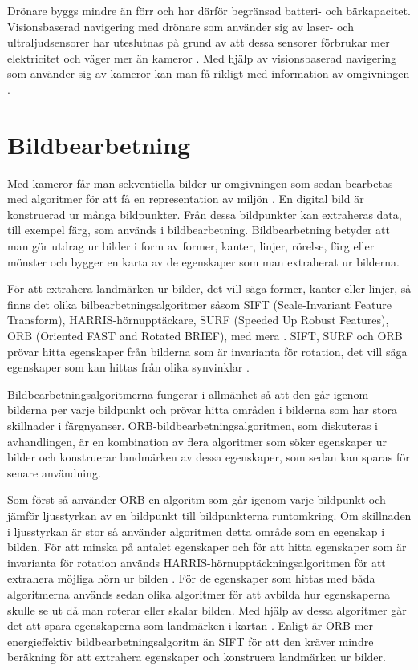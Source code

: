 Drönare byggs mindre än förr och har därför begränsad batteri- och bärkapacitet. Visionsbaserad navigering med drönare som använder sig av laser- och ultraljudsensorer har uteslutnas på grund av att dessa sensorer förbrukar mer elektricitet och väger mer än kameror \citep{6385934}. Med hjälp av visionsbaserad navigering som använder sig av kameror kan man få rikligt med information av omgivningen \citep{geospatial}.

\section{Bildbearbetning}

Med kameror får man sekventiella bilder ur omgivningen som sedan bearbetas med algoritmer för att få en representation av miljön \citep{982903}. En digital bild är konstruerad ur många bildpunkter. Från dessa bildpunkter kan extraheras data, till exempel färg, som används i bildbearbetning. Bildbearbetning betyder att man gör utdrag ur bilder i form av former, kanter, linjer, rörelse, färg eller mönster och bygger en karta av de egenskaper som man extraherat ur bilderna. 

För att extrahera landmärken ur bilder, det vill säga former, kanter eller linjer, så finns det olika bilbearbetningsalgoritmer såsom SIFT (Scale-Invariant Feature Transform), HARRIS-hörnupptäckare, SURF (Speeded Up Robust Features), ORB (Oriented FAST and Rotated BRIEF), med mera \citep{orb, slamproblem, mapbuildingsift}. SIFT, SURF och ORB prövar hitta egenskaper från bilderna som är invarianta för rotation, det vill säga egenskaper som kan hittas från olika synvinklar \citep{orb}. 

Bildbearbetningsalgoritmerna fungerar i allmänhet så att den går igenom bilderna per varje bildpunkt och prövar hitta områden i bilderna som har stora skillnader i färgnyanser. ORB-bildbearbetningsalgoritmen, som diskuteras i avhandlingen, är en kombination av flera algoritmer som söker egenskaper ur bilder och konstruerar landmärken av dessa egenskaper, som sedan kan sparas för senare användning. 

Som först så använder ORB en algoritm som går igenom varje bildpunkt och jämför ljusstyrkan av en bildpunkt till bildpunkterna runtomkring. Om skillnaden i ljusstyrkan är stor så använder algoritmen detta område som en egenskap i bilden. För att minska på antalet egenskaper och för att hitta egenskaper som är invarianta för rotation används HARRIS-hörnupptäckningsalgoritmen för att extrahera möjliga hörn ur bilden \citep{orb}. För de egenskaper som hittas med båda algoritmerna används sedan olika algoritmer för att avbilda hur egenskaperna skulle se ut då man roterar eller skalar bilden. Med hjälp av dessa algoritmer går det att spara egenskaperna som landmärken i kartan \citep{orb}. Enligt \cite{orb} är ORB mer energieffektiv bildbearbetningsalgoritm än SIFT för att den kräver mindre beräkning för att extrahera egenskaper och konstruera landmärken ur bilder.

